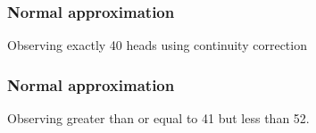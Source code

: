 \documentclass[handout]{beamer}
\begin{document}
   \begin{frame}
   \frametitle{Normal approximation}
   \begin{center}
   \end{center}
   Observing exactly 40 heads using continuity correction
   \end{frame}



   \begin{frame}
   \frametitle{Normal approximation}
   \begin{center}
   \end{center}
   Observing greater than or equal to 41 but less than 52.
   \end{frame}

\end{document}
